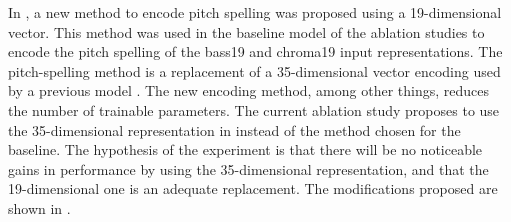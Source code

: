
In , a new method to encode
pitch spelling was proposed using a 19-dimensional vector.
This method was used in the baseline model of the ablation
studies to encode the pitch spelling of the \gls{bass19} and
\gls{chroma19} input representations. The pitch-spelling
method is a replacement of a 35-dimensional vector encoding
used by a previous model \parencite{micchi2021deep}. The new
encoding method, among other things, reduces the number of
trainable parameters. The current ablation study proposes to
use the 35-dimensional representation in
\textcite{micchi2021deep} instead of the method chosen for
the baseline. The hypothesis of the experiment is that there
will be no noticeable gains in performance by using the
35-dimensional representation, and that the 19-dimensional
one is an adequate replacement. The modifications proposed
are shown in .

